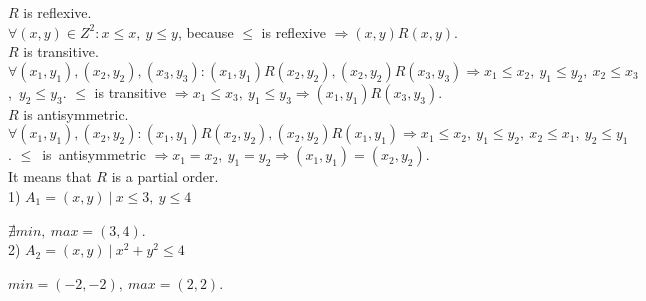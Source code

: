 \documentclass{article}
\begin{document}
$R$ is reflexive.\\
$\forall (x,y) \in Z^2: x \leq x,~y \leq y$, because $\leq$ is reflexive $\Rightarrow (x,y) R (x,y)$.\\

$R$ is transitive.\\
$\forall (x_1,y_1), (x_2,y_2), (x_3,y_3): (x_1,y_1) R (x_2,y_2), (x_2,y_2) R (x_3,y_3) \Rightarrow x_1 \leq x_2,~y_1 \leq y_2,~x_2 \leq x_3$,\ $y_2 \leq y_3$. $\leq$ is transitive $\Rightarrow x_1 \leq x_3,~y_1 \leq y_3 \Rightarrow (x_1,y_1) R (x_3,y_3)$.\\

$R$ is antisymmetric.\\
$\forall (x_1,y_1), (x_2,y_2): (x_1,y_1) R (x_2,y_2), (x_2,y_2) R (x_1,y_1) \Rightarrow x_1 \leq x_2,~y_1 \leq y_2,~x_2 \leq x_1,~y_2 \leq y_1$. $\leq$~is~antisymmetric $\Rightarrow x_1 = x_2,~y_1 = y_2 \Rightarrow (x_1,y_1) = (x_2,y_2)$.\\

It means that $R$ is a partial order.\\

1) $A_1 = {(x,y)~|~x \leq 3,~y \leq 4}$

$\nexists min,~max = (3,4)$.\\

2) $A_2 = {(x,y)~|~x^2 + y^2 \leq 4}$

$min = (-2,-2),~max = (2,2)$.

 
\end{document}
